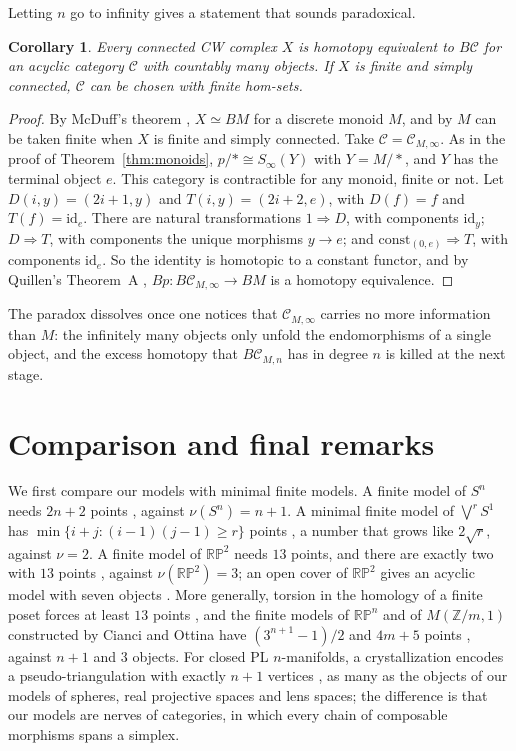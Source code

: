 \documentclass[12pt]{amsart}
\newtheorem{corollary}[teo]{Corollary}
\theoremstyle{definition}
\theoremstyle{remark}
\newcommand{\CC}{\mathcal{C}}
\newcommand{\co}{\colon}
\newcommand{\id}{\mathrm{id}}
\newcommand{\Z}{\mathbb{Z}}
\newcommand{\M}{M}
\newcommand{\RP}{\mathbb{RP}}
\begin{document}
Letting $n$ go to infinity gives a statement that sounds paradoxical.

\begin{corollary}\label{cor:paradox}
Every connected CW complex $X$ is homotopy equivalent to $B\CC$ for an acyclic category $\CC$ with countably many objects. If $X$ is finite and simply connected, $\CC$ can be chosen with finite hom-sets.
\end{corollary}

\begin{proof}
By McDuff's theorem \cite{McDuff1979}, $X\simeq BM$ for a discrete monoid $M$, and by \cite[Theorem~C]{BenBassat2026} $M$ can be taken finite when $X$ is finite and simply connected. Take $\CC=\CC_{M,\infty}$. As in the proof of Theorem~\ref{thm:monoids}, $p/{*}\cong S_\infty(Y)$ with $Y=M/{*}$, and $Y$ has the terminal object $e$. This category is contractible for any monoid, finite or not. Let $D(i,y)=(2i+1,y)$ and $T(i,y)=(2i+2,e)$, with $D(f)=f$ and $T(f)=\id_e$. There are natural transformations $1\Rightarrow D$, with components $\id_y$; $D\Rightarrow T$, with components the unique morphisms $y\to e$; and $\mathrm{const}_{(0,e)}\Rightarrow T$, with components $\id_e$. So the identity is homotopic to a constant functor, and by Quillen's Theorem~A \cite{Quillen1973}, $Bp\co B\CC_{M,\infty}\to BM$ is a homotopy equivalence.
\end{proof}

The paradox dissolves once one notices that $\CC_{M,\infty}$ carries no more information than $M$: the infinitely many objects only unfold the endomorphisms of a single object, and the excess homotopy that $B\CC_{M,n}$ has in degree $n$ is killed at the next stage.

\section{Comparison and final remarks}\label{sec:comparison}

We first compare our models with minimal finite models. A finite model of $S^n$ needs $2n+2$ points \cite[Theorem~2.13]{BarmakMinian2007}, against $\nu(S^n)=n+1$. A minimal finite model of $\bigvee^rS^1$ has $\min\{i+j:(i-1)(j-1)\ge r\}$ points \cite{BarmakMinian2007}, a number that grows like $2\sqrt r$, against $\nu=2$. A finite model of $\RP^2$ needs $13$ points, and there are exactly two with $13$ points \cite[Corollary~5.8, Theorem~5.11]{CianciOttina2018}, against $\nu(\RP^2)=3$; an open cover of $\RP^2$ gives an acyclic model with seven objects \cite{CarcaciaCampos2026OpenCovers}. More generally, torsion in the homology of a finite poset forces at least $13$ points \cite[Theorem~5.10]{CianciOttina2018}, and the finite models of $\RP^n$ and of $\M(\Z/m,1)$ constructed by Cianci and Ottina have $(3^{n+1}-1)/2$ and $4m+5$ points \cite[Propositions~7.1 and~7.7]{CianciOttina2018}, against $n+1$ and $3$ objects. For closed PL $n$-manifolds, a crystallization encodes a pseudo-triangulation with exactly $n+1$ vertices \cite{Pezzana1974,Pezzana1975}, as many as the objects of our models of spheres, real projective spaces and lens spaces; the difference is that our models are nerves of categories, in which every chain of composable morphisms spans a simplex.
\end{document}
